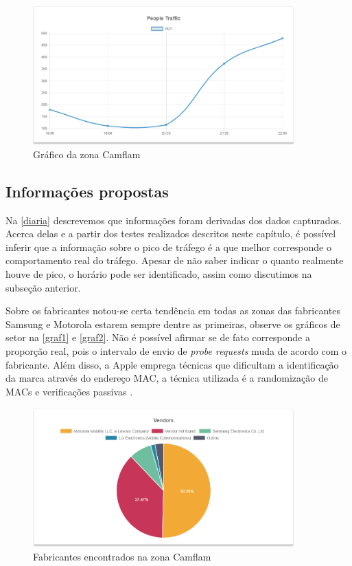 \begin{figure}[!h]
  \caption{\label{camflam-graph}Gráfico da zona Camflam}
  \begin{center}
    \includegraphics[width=0.90\textwidth]{img/camflam-graph.png}
  \end{center}
\end{figure}

\subsection{Informações propostas}
Na \autoref{diaria} descrevemos que informações foram derivadas dos dados capturados. Acerca delas e a partir
dos testes realizados descritos neste capítulo, é possível inferir que a informação sobre o pico de tráfego
é a que melhor corresponde o comportamento real do tráfego. Apesar de não saber indicar o quanto realmente houve de pico, o
horário pode ser identificado, assim como discutimos na subseção anterior.

Sobre os fabricantes notou-se certa tendência em todas as zonas das fabricantes Samsung e Motorola estarem
sempre dentre as primeiras, observe os gráficos de setor na \autoref{graf1} e \autoref{graf2}. Não é possível afirmar se de fato corresponde a proporção real, pois o intervalo de envio
de \emph{probe requests} muda de acordo com o fabricante. Além disso, a Apple emprega técnicas que dificultam
a identificação da marca através do endereço MAC, a técnica utilizada é a randomização de MACs e verificações passivas \cite{Apple2016}.

\begin{figure}[!h]
  \caption{\label{graf1}Fabricantes encontrados na zona Camflam}
  \begin{center}
    \includegraphics[width=0.90\textwidth]{img/setor-camflam.png}
  \end{center}
\end{figure}

